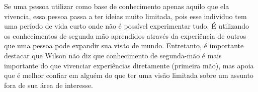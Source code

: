 Se uma pessoa utilizar como base de conhecimento apenas aquilo que ela vivencia, essa pessoa passa a ter ideias muito limitada, pois esse individuo tem uma período de vida curto onde não é possível experimentar tudo. É utilizando os conhecimentos de segunda mão aprendidos através da experiência de outros que uma pessoa pode expandir sua visão de mundo. Entretanto, é importante destacar que Wilson não diz que conhecimento de segunda-mão é mais importante do que vivenciar experiências diretamente (primeira mão), mas apoia que é melhor confiar em alguém do que ter uma visão limitada sobre um assunto fora de sua área de interesse.
